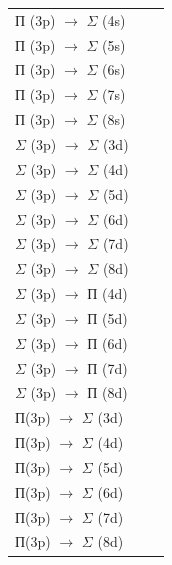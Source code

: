 \begin{flushleft}
\begin{supertabular}{|m{5.4360003cm}|m{6.3630004cm}|m{4.584cm}|}
 &
\raggedleft{}\\\hline
{П (3p) $\rightarrow $ $\Sigma $ (4s)} &
 &
\raggedleft{}\\
{П (3p) $\rightarrow $ $\Sigma $ (5s)} &
 &
\raggedleft{}\\
{П (3p) $\rightarrow $ $\Sigma $ (6s)} &
 &
\raggedleft{}\\
{П (3p) $\rightarrow $ $\Sigma $ (7s)} &
 &
\raggedleft{}\\
{П (3p) $\rightarrow $ $\Sigma $ (8s)} &
 &
\raggedleft{}\\\hline
{$\Sigma $ (3p) $\rightarrow $ $\Sigma $ (3d)} &
 &
\raggedleft{}\\
{$\Sigma $ (3p) $\rightarrow $ $\Sigma $ (4d)} &
 &
\raggedleft{}\\
{$\Sigma $ (3p) $\rightarrow $ $\Sigma $ (5d)} &
 &
\raggedleft{}\\
{$\Sigma $ (3p) $\rightarrow $ $\Sigma $ (6d)} &
 &
\raggedleft{}\\
{$\Sigma $ (3p) $\rightarrow $ $\Sigma $ (7d)} &
 &
\raggedleft{}\\
{$\Sigma $ (3p) $\rightarrow $ $\Sigma $ (8d)} &
 &
\raggedleft{}\\\hline
{$\Sigma $ (3p) $\rightarrow $ П (4d)} &
 &
\raggedleft{}\\
{$\Sigma $ (3p) $\rightarrow $ П (5d)} &
 &
\raggedleft{}\\
{$\Sigma $ (3p) $\rightarrow $ П (6d)} &
 &
\raggedleft{}\\
{$\Sigma $ (3p) $\rightarrow $ П (7d)} &
 &
\raggedleft{}\\
{$\Sigma $ (3p) $\rightarrow $ П (8d)} &
 &
\raggedleft{}\\\hline
{П(3p) $\rightarrow $ $\Sigma $ (3d)} &
 &
\raggedleft{}\\
{П(3p) $\rightarrow $ $\Sigma $ (4d)} &
 &
\raggedleft{}\\
{П(3p) $\rightarrow $ $\Sigma $ (5d)} &
 &
\raggedleft{}\\
{П(3p) $\rightarrow $ $\Sigma $ (6d)} &
 &
\raggedleft{}\\
{П(3p) $\rightarrow $ $\Sigma $ (7d)} &
 &
\raggedleft{}\\
{П(3p) $\rightarrow $ $\Sigma $ (8d)} &
 &
\raggedleft{}\\\hline
\end{supertabular}
\end{flushleft}

